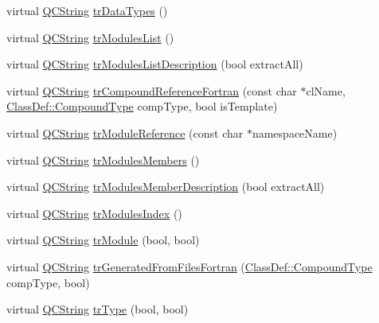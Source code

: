 \begin{DoxyCompactItemize}
virtual \hyperlink{class_q_c_string}{Q\-C\-String} \hyperlink{class_translator_chinesetraditional_a77941890cf3f7cd1b67bec4cea91439b}{tr\-Data\-Types} ()
\item 
virtual \hyperlink{class_q_c_string}{Q\-C\-String} \hyperlink{class_translator_chinesetraditional_a411e2c242c2707aed706b2b0572292db}{tr\-Modules\-List} ()
\item 
virtual \hyperlink{class_q_c_string}{Q\-C\-String} \hyperlink{class_translator_chinesetraditional_a4f1ad06ac7478b9058d7f388a2b67566}{tr\-Modules\-List\-Description} (bool extract\-All)
\item 
virtual \hyperlink{class_q_c_string}{Q\-C\-String} \hyperlink{class_translator_chinesetraditional_a79d39414275f1cacb484f78806a65869}{tr\-Compound\-Reference\-Fortran} (const char $\ast$cl\-Name, \hyperlink{class_class_def_a768a6f0a6fd7e9087ff7971abbcc3f36}{Class\-Def\-::\-Compound\-Type} comp\-Type, bool is\-Template)
\item 
virtual \hyperlink{class_q_c_string}{Q\-C\-String} \hyperlink{class_translator_chinesetraditional_a5b0385db8ce8e7c8251e31867c6fa8d5}{tr\-Module\-Reference} (const char $\ast$namespace\-Name)
\item 
virtual \hyperlink{class_q_c_string}{Q\-C\-String} \hyperlink{class_translator_chinesetraditional_a75279d9914e0cc54ee5f4b15ddaa234c}{tr\-Modules\-Members} ()
\item 
virtual \hyperlink{class_q_c_string}{Q\-C\-String} \hyperlink{class_translator_chinesetraditional_a26dd0f47c7f59841f901da7f4bd19306}{tr\-Modules\-Member\-Description} (bool extract\-All)
\item 
virtual \hyperlink{class_q_c_string}{Q\-C\-String} \hyperlink{class_translator_chinesetraditional_a8a71cbe9e0669d3555731c3ebc0aae35}{tr\-Modules\-Index} ()
\item 
virtual \hyperlink{class_q_c_string}{Q\-C\-String} \hyperlink{class_translator_chinesetraditional_aa864eadd7f41b0282ceae3ebe46c4f51}{tr\-Module} (bool, bool)
\item 
virtual \hyperlink{class_q_c_string}{Q\-C\-String} \hyperlink{class_translator_chinesetraditional_ad56ee2b4646b53abea0fd11f17a32fc5}{tr\-Generated\-From\-Files\-Fortran} (\hyperlink{class_class_def_a768a6f0a6fd7e9087ff7971abbcc3f36}{Class\-Def\-::\-Compound\-Type} comp\-Type, bool)
\item 
virtual \hyperlink{class_q_c_string}{Q\-C\-String} \hyperlink{class_translator_chinesetraditional_a9052b1bb4e1dd5357873e8c25a51a761}{tr\-Type} (bool, bool)
\item 

\end{DoxyCompactItemize}
